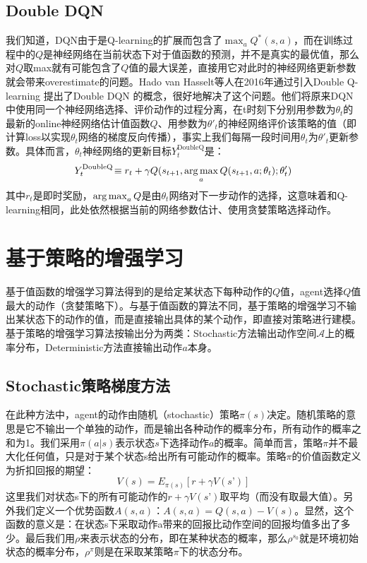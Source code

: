\subsection{Double DQN}
我们知道，DQN由于是Q-learning的扩展而包含了$\max_a Q^*(s,a)$，而在训练过程中的$Q$是神经网络在当前状态下对于值函数的预测，并不是真实的最优值，那么对$Q$取max就有可能包含了$Q$值的最大误差，直接用它对此时的神经网络更新参数就会带来overestimate的问题。Hado van Hasselt等人在2016年通过引入Double Q-learning \cite{hado2010double} 提出了Double DQN \cite{hado2016deep}的概念，很好地解决了这个问题。他们将原来DQN中使用同一个神经网络选择、评价动作的过程分离，在t时刻下分别用参数为$\theta_t$的最新的online神经网络估计值函数$Q$、用参数为$\theta'_t$的神经网络评价该策略的值（即计算loss以实现$\theta_t$网络的梯度反向传播），事实上我们每隔一段时间用$\theta_t$为$\theta'_t$更新参数。具体而言，$\theta_t$神经网络的更新目标$Y^{\text{DoubleQ}}_t$是：
\begin{equation}
Y^{\text{DoubleQ}}_t \!\equiv r_{t} + \gamma Q(s_{t+1}, \operatorname*{arg\,max}_a Q(s_{t+1}, a; \theta_t); \theta'_t )
\label{doubledqn}
\end{equation}
其中$r_{t}$是即时奖励，$\operatorname*{arg\,max}_a Q$是由$\theta_t$网络对下一步动作的选择，这意味着和Q-learning相同，此处依然根据当前的网络参数估计、使用贪婪策略选择动作。
\section{基于策略的增强学习}
基于值函数的增强学习算法得到的是给定某状态下每种动作的$Q$值，agent选择$Q$值最大的动作（贪婪策略下）。与基于值函数的算法不同，基于策略的增强学习不输出某状态下的动作的值，而是直接输出具体的某个动作，即直接对策略进行建模。基于策略的增强学习算法按输出分为两类：Stochastic方法输出动作空间$\mathcal{A}$上的概率分布，Deterministic方法直接输出动作$a$本身。

\subsection{Stochastic策略梯度方法}
在此种方法中，agent的动作由随机（stochastic）策略$\pi (s)$决定。随机策略的意思是它不输出一个单独的动作，而是输出各种动作的概率分布，所有动作的概率之和为1。我们采用$\pi (a|s)$表示状态$s$下选择动作$a$的概率。简单而言，策略$\pi$并不最大化任何值，只是对于某个状态s给出所有可能动作的概率。策略$\pi$的价值函数定义为折扣回报的期望：
\begin{equation}
V(s) = E_{\pi (s)}[r + \gamma V(s’)]
\end{equation}
这里我们对状态s下的所有可能动作的$r + \gamma V(s’)$取平均（而没有取最大值）。另外我们定义一个优势函数$A(s, a)$：$A(s,a) = Q(s,a) - V(s) $。显然，这个函数的意义是：在状态s下采取动作a带来的回报比动作空间的回报均值多出了多少。最后我们用$\rho$来表示状态的分布，即在某种状态的概率，那么$\rho^{s_0}$就是环境初始状态的概率分布，$\rho^\pi$则是在采取某策略$\pi$下的状态分布。

